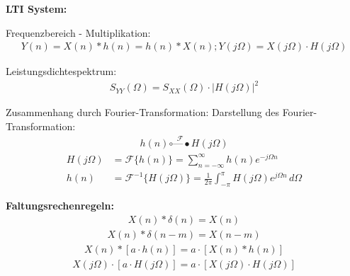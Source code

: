 



\textbf{LTI System:}


Frequenzbereich - Multiplikation:
\begin{align}
Y(n) = X(n) * h(n) = h(n) * X(n); Y(j\Omega) = X(j\Omega) \cdot H(j\Omega)
\end{align}

Leistungsdichtespektrum:
\begin{align}
S_{YY}(\Omega) = S_{XX}(\Omega) \cdot |H(j\Omega)|^2
\end{align}

Zusammenhang durch Fourier-Transformation:
Darstellung des Fourier-Transformation:
\begin{align}
h(n) \overset{\mathcal{F}}{\circ\mbox{---}\bullet} H(j\Omega)
\end{align}
\begin{align}
H(j\Omega) &= \mathcal{F}\{h(n)\} = \sum_{n=-\infty}^{\infty} h(n) e^{-j\Omega n} \\
h(n) &= \mathcal{F}^{-1}\{H(j\Omega)\} = \frac{1}{2\pi} \int_{-\pi}^{\pi} H(j\Omega) e^{j\Omega n} \, d\Omega
\end{align}


\textbf{Faltungsrechenregeln:}
\begin{align}
X(n) * \delta(n) = X(n)
\end{align}
\begin{align}
X(n) * \delta(n-m) = X(n-m)
\end{align}
\begin{align}
X(n) * [a \cdot h(n)] = a \cdot [X(n) * h(n)]
\end{align}
\begin{align}
X(j\Omega) \cdot [a \cdot H(j\Omega)] = a \cdot [X(j\Omega) \cdot H(j\Omega)]
\end{align}
